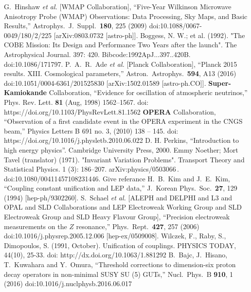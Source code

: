 \begin{thebibliography}{9}
  G.~Hinshaw {\it et al.} [WMAP Collaboration],
  ``Five-Year Wilkinson Microwave Anisotropy Probe (WMAP) Observations: Data Processing, Sky Maps, and Basic Results,''
  Astrophys.\ J.\ Suppl.\  {\bf 180}, 225 (2009)
  doi:10.1088/0067-0049/180/2/225
  [arXiv:0803.0732 [astro-ph]].
  Boggess, N. W.; et al. (1992). 
  "The COBE Mission: Its Design and Performance Two Years after the launch". 
  The Astrophysical Journal. 397: 420. 
  Bibcode:1992ApJ...397..420B.
  doi:10.1086/171797.
  P.~A.~R.~Ade {\it et al.} [Planck Collaboration],
  ``Planck 2015 results. XIII. Cosmological parameters,''
  Astron.\ Astrophys.\  {\bf 594}, A13 (2016)
  doi:10.1051/0004-6361/201525830
  [arXiv:1502.01589 [astro-ph.CO]].
  {\bf Super-Kamiokande} Collaboration, 
  “Evidence for oscillation of atmospheric neutrinos,” 
  Phys. Rev. Lett. {\bf 81} (Aug, 1998) 1562–1567.
   doi: https://doi.org/10.1103/PhysRevLett.81.1562
   {\bf OPERA} Collaboration,
    “Observation of a first candidate event in the OPERA experiment in the CNGS beam,” 
    Physics Letters B 691 no. 3, (2010) 138 – 145. 
    doi: https://doi.org/10.1016/j.physletb.2010.06.022
   D. H. Perkins, ``Introduction to high energy physics''.
   Cambridge University Press, 2000.
  Emmy Noether; Mort Tavel (translator) (1971).
"Invariant Variation Problems". Transport Theory and Statistical Physics. 1 (3): 186–207. arXiv:physics/0503066 . doi:10.1080/00411457108231446.
Give referance
  H.~B.~Kim and J.~E.~Kim,
  ``Coupling constant unification and LEP data,''
  J.\ Korean Phys.\ Soc.\  {\bf 27}, 129 (1994)
  [hep-ph/9302260].
  S.~Schael {\it et al.} [ALEPH and DELPHI and L3 and OPAL and SLD Collaborations and LEP Electroweak Working Group and SLD Electroweak Group and SLD Heavy Flavour Group],
  ``Precision electroweak measurements on the $Z$ resonance,''
  Phys.\ Rept.\  {\bf 427}, 257 (2006)
  doi:10.1016/j.physrep.2005.12.006
  [hep-ex/0509008].
Wilczek, F., Raby, S., Dimopoulos, S. (1991, October). 
Unification of couplings. PHYSICS TODAY, 44(10), 25-33. 
doi: http://dx.doi.org/10.1063/1.881292
  B.~Bajc, J.~Hisano, T.~Kuwahara and Y.~Omura,
  ``Threshold corrections to dimension-six proton decay operators in non-minimal SUSY SU (5) GUTs,''
  Nucl.\ Phys.\ B {\bf 910}, 1 (2016)
  doi:10.1016/j.nuclphysb.2016.06.017

\end{thebibliography}
